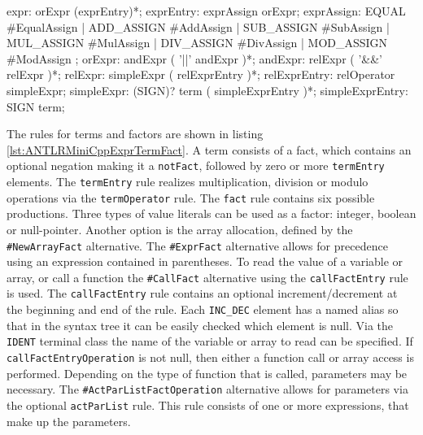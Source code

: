 \begin{AntlrCode}[float,numbers=none,caption=Expression rules for assignment and boolean operations of the MiniC++ ANTLR grammar., label=lst:ANTLRMiniCppExprBool]
expr:               orExpr (exprEntry)*;
exprEntry:          exprAssign orExpr;
exprAssign:           EQUAL      #EqualAssign
                    | ADD_ASSIGN #AddAssign
                    | SUB_ASSIGN #SubAssign
                    | MUL_ASSIGN #MulAssign
                    | DIV_ASSIGN #DivAssign
                    | MOD_ASSIGN #ModAssign
                    ;
orExpr:             andExpr ( '||' andExpr )*;
andExpr:            relExpr ( '&&' relExpr )*;
relExpr:            simpleExpr
                    ( relExprEntry )*;
relExprEntry:       relOperator simpleExpr;
simpleExpr:         (SIGN)?
                    term ( simpleExprEntry )*;
simpleExprEntry:    SIGN term;
\end{AntlrCode}

The rules for terms and factors are shown in listing \ref{lst:ANTLRMiniCppExprTermFact}. A term consists of a fact, which contains an optional negation making it a \verb|notFact|, followed by zero or more \verb|termEntry| elements. The \verb|termEntry| rule realizes multiplication, division or modulo operations via the \verb|termOperator| rule. The \verb|fact| rule contains six possible productions. Three types of value literals can be used as a factor: integer, boolean or null-pointer. Another option is the array allocation, defined by the \verb|#NewArrayFact| alternative. The \verb|#ExprFact| alternative allows for precedence using an expression contained in parentheses. To read the value of a variable or array, or call a function the \verb|#CallFact| alternative using the \verb|callFactEntry| rule is used. The \verb|callFactEntry| rule contains an optional increment/decrement at the beginning and end of the rule. Each \verb|INC_DEC| element has a named alias so that in the syntax tree it can be easily checked which element is null. Via the \verb|IDENT| terminal class the name of the variable or array to read can be specified. If \verb|callFactEntryOperation| is not null, then either a function call or array access is performed. Depending on the type of function that is called, parameters may be necessary. The \verb|#ActParListFactOperation| alternative allows for parameters via the optional \verb|actParList| rule. This rule consists of one or more expressions, that make up the parameters.     

